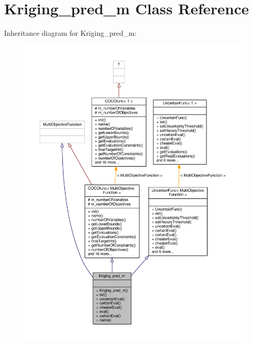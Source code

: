 \hypertarget{classKriging__pred__m}{}\section{Kriging\+\_\+pred\+\_\+m Class Reference}
\label{classKriging__pred__m}


Inheritance diagram for Kriging\+\_\+pred\+\_\+m\+:
\nopagebreak
\begin{figure}[H]
\begin{center}
\leavevmode
\includegraphics[width=350pt]{classKriging__pred__m__inherit__graph}
\end{center}
\end{figure}


